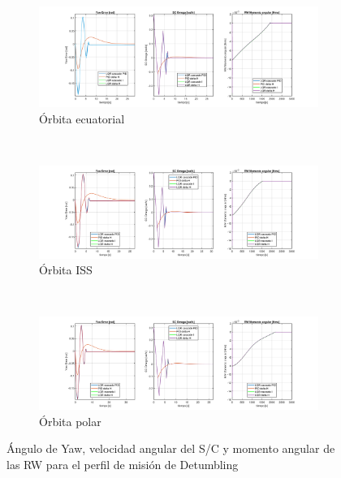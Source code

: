 \begin{figure}[!ht]
	\centering
	\begin{subfigure}{1.2\linewidth}
		\includegraphics[width=\linewidth]{imagenes/resultados/Detumbling/orbit_zero/yaw_omega_h_zero.PNG}
		\caption{Órbita ecuatorial}
		\label{fig:orbita_ecuatorial_Detumbling}
	\end{subfigure}\\
	\begin{subfigure}{1.2\linewidth}
		\includegraphics[width=\linewidth]{imagenes/resultados/Detumbling/orbit_iss/yaw_omega_h_iss.PNG}
		\caption{Órbita ISS}
		\label{fig:orbita_iss_Detumbling}
	\end{subfigure}\\
	\begin{subfigure}{1.2\linewidth}
		\includegraphics[width=\linewidth]{imagenes/resultados/Detumbling/orbit_polar/yaw_omega_h_polar.PNG}
		\caption{Órbita polar}
		\label{fig:orbita_polar_Detumbling}
	\end{subfigure}
	\caption{Ángulo de Yaw, velocidad angular del S/C y momento angular de las RW para el perfil de misión de Detumbling}
	\label{fig:Detumbling_ecuatorial}
\end{figure}
\clearpage
